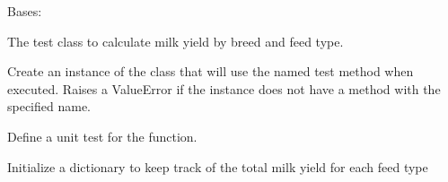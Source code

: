 \documentclass[letterpaper,10pt,english]{sphinxmanual}
\begin{document}
\begin{fulllineitems}
\label{\detokenize{farming:farming.part2.TestCalculateMilkYieldByBreedAndFeedType}}
\sphinxAtStartPar
Bases: 

\sphinxAtStartPar
The test class to calculate milk yield by breed and feed type.

\sphinxAtStartPar
Create an instance of the class that will use the named test
method when executed. Raises a ValueError if the instance does
not have a method with the specified name.

\begin{fulllineitems}
\label{\detokenize{farming:farming.part2.TestCalculateMilkYieldByBreedAndFeedType.test_calculate_milk_yield_by_breed_and_feed_type}}
\sphinxAtStartPar
Define a unit test for the {\hyperref[\detokenize{farming:farming.part2.calculate_milk_yield_by_breed_and_feed_type}]{}} function.

\end{fulllineitems}


\end{fulllineitems}


\begin{fulllineitems}
\label{\detokenize{farming:farming.part2.calculate_milk_yield_by_breed_and_feed_type}}
\sphinxAtStartPar
Initialize a dictionary to keep track of the total milk yield for each feed type

\end{fulllineitems}
\end{document}
